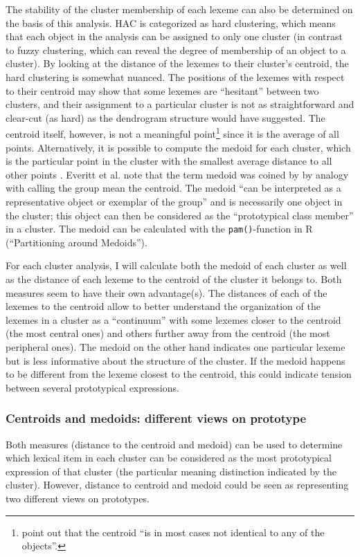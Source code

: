 The stability of the cluster membership of each lexeme can also be determined on the basis of this analysis. HAC is categorized as hard clustering, which means that each object in the analysis can be assigned to only one cluster (in contrast to fuzzy clustering, which can reveal the degree of membership of an object to a cluster). By looking at the distance of the lexemes to their cluster’s centroid, the hard clustering is somewhat nuanced. The positions of the lexemes with respect to their centroid may show that some lexemes are ``hesitant'' between two clusters, and their assignment to a particular cluster is not as straightforward and clear-cut (as hard) as the dendrogram structure would have suggested. The centroid itself, however, is not a meaningful point\footnote{\citet[516]{manning_foundations_1999} point out that the centroid “is in most cases not identical to any of the objects”.} since it is the average of all points. Alternatively, it is possible to compute the medoid for each cluster, which is the particular point in the cluster with the smallest average distance to all other points \citep[164]{divjak_structuring_2010}. Everitt et al. \citep[113]{everitt_cluster_2011} note that the term medoid was coined by \citet{kaufman_finding_1990} by analogy with calling the group mean the centroid. The medoid “can be interpreted as a representative object or exemplar of the group” \citep[113]{everitt_cluster_2011} and is necessarily one object in the cluster; this object can then be considered as the “prototypical class member” \citep[516]{manning_foundations_1999} in a cluster. The medoid can be calculated with the \texttt{pam()}-function in R (``Partitioning around Medoids'').

For each cluster analysis, I will calculate both the medoid of each cluster as well as the distance of each lexeme to the centroid of the cluster it belongs to. Both measures seem to have their own advantage(s). The distances of each of the lexemes to the centroid allow to better understand the organization of the lexemes in a cluster as a ``continuum'' with some lexemes closer to the centroid (the most central ones) and others further away from the centroid (the most peripheral ones). The medoid on the other hand indicates one particular lexeme but is less informative about the structure of the cluster. If the medoid happens to be different from the lexeme closest to the centroid, this could indicate tension between several prototypical expressions.

\subsubsection{Centroids and medoids: different views on prototype}
\label{sec:3.8.1.3}
Both measures (distance to the centroid and medoid) can be used to determine which lexical item in each cluster can be considered as the most prototypical expression of that cluster (the particular meaning distinction indicated by the cluster). However, distance to centroid and medoid could be seen as representing two different views on prototypes.


